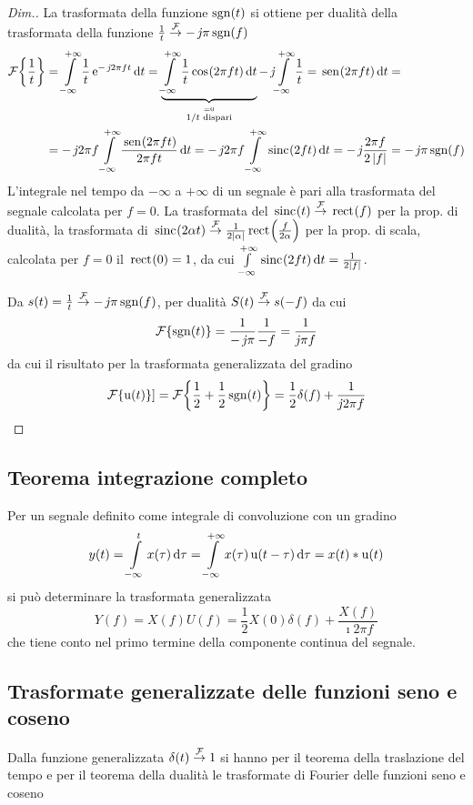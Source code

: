 \begin{proof}[Dim.]
La trasformata della funzione $\operatorname{sgn}(t)$ si ottiene per dualità della trasformata della funzione $\frac{1}{t}\overset{\operatorname{\mathcal{F}}}{\to}-\operatorname{\mathit{j}\!}\pi\operatorname{sgn}(f)$
\begin{align*}
	\fourier{\frac{1}{t}}&=\intinf{\frac{1}{t}\e{-\imath 2\pi f t}}{t}= \underbrace{\intinf{\frac{1}{t}\cos{2\pi f t}}{t}}_{\stackrel{=0}{1/t \text{ dispari}}}-\imath\intinf{\frac{1}{t}=\sen{2\pi f t}}{t}=\\
	&=-\imath 2\pi f\intinf{\frac{\sen{2\pi f t}}{2\pi f t}}{t}=-\imath 2\pi f\intinf{\sinc{2 f t}}{t}=-\imath\frac{2\pi f}{2\abs{f}}=-\imath\pi\sgn(f)
\end{align*}
L'integrale nel tempo da $-\infty$ a $+\infty$ di un segnale è pari alla trasformata del segnale calcolata per $f=0$. 
La trasformata del $\,{\operatorname{sinc}}^{}\!\left({t}\right)\overset{\operatorname{\mathcal{F}}}{\to}\,{\operatorname{rect}}^{}\!\left({f}\right)$ per la prop. di dualità, la trasformata di $\,{\operatorname{sinc}}^{}\!\left({2\alpha t}\right)\overset{\operatorname{\mathcal{F}}}{\to}\frac{1}{2\left|{\alpha}\right|}\,{\operatorname{rect}}^{}\!\left({\frac{f}{2\alpha}}\right)$ per la prop. di scala, calcolata per $f=0$ il $\,{\operatorname{rect}}^{}\!\left({0}\right)=1$, da cui $\int\limits_{-\infty}^{+\infty}{\,{\operatorname{sinc}}^{}\!\left({2 f t}\right)}{\,\mathop{}\!\mathrm{d}{t}}=\frac{1}{2\left|{f}\right|}$.

Da $s(t)=\frac{1}{t}\overset{\operatorname{\mathcal{F}}}{\to}-\operatorname{\mathit{j}\!}\pi\operatorname{sgn}(f)$, per dualità $S(t)\overset{\operatorname{\mathcal{F}}}{\to} s(-f)$ da cui
\[
	\operatorname{\mathcal{F}}\!\left\lbrace{\operatorname{sgn}(t)}\right\rbrace=\frac{1}{-\operatorname{\mathit{j}\!}\pi}\frac{1}{-f}=\frac{1}{\operatorname{\mathit{j}\!}\pi f}
\]
da cui il risultato per la trasformata generalizzata del gradino
\[
	\operatorname{\mathcal{F}}\!\left\lbrace{\operatorname{u}(t)}\right\rbrace]=\operatorname{\mathcal{F}}\!\left\lbrace{\frac{1}{2}+\frac{1}{2}\operatorname{sgn}(t)}\right\rbrace=\frac{1}{2}\delta(f)+\frac{1}{\operatorname{\mathit{j}\!} 2\pi f}
\qedhere
\]
\end{proof}

\subsection{Teorema integrazione completo}
Per un segnale definito come integrale di convoluzione con un gradino
\[
	y(t)=\int\limits_{-\infty}^{t}{x(\tau)}{\,\mathop{}\!\mathrm{d}{\tau}}=\int\limits_{-\infty}^{+\infty}{x(\tau)\operatorname{u}(t-\tau)}{\,\mathop{}\!\mathrm{d}{\tau}}=x(t)\ast\operatorname{u}(t)
\]
si può determinare la trasformata generalizzata
\begin{equation}
	Y(f)=X(f) U(f)=\frac{1}{2} X(0) \delta(f) + \frac{X(f)}{\imath 2\pi f}
\end{equation}
che tiene conto nel primo termine della componente continua del segnale.

\subsection{Trasformate generalizzate delle funzioni seno e coseno}
Dalla funzione generalizzata $\delta(t)\overset{\operatorname{\mathcal{F}}}{\rightarrow}1$ si hanno per il teorema della traslazione del tempo e per il teorema della dualità le trasformate di Fourier delle funzioni seno e coseno

